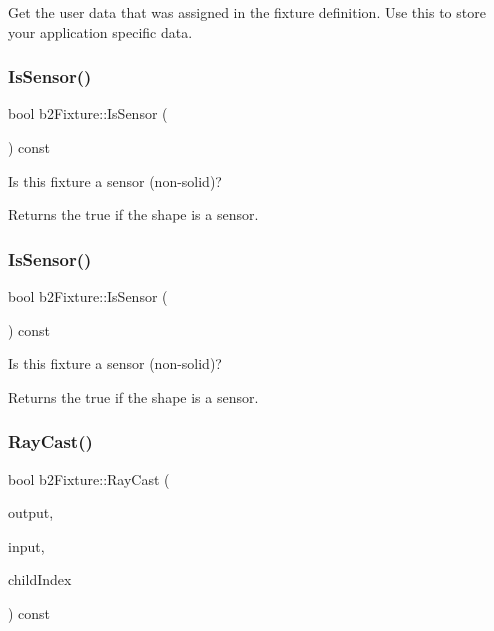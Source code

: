 Get the user data that was assigned in the fixture definition. Use this to store your application specific data. \mbox{\label{classb2Fixture_aedd23d27ff7ce2d53b6c5b7a878a35d3}} 
\subsubsection{\texorpdfstring{Is\+Sensor()}{IsSensor()}\hspace{0.1cm}{\footnotesize\ttfamily [1/2]}}
{\footnotesize\ttfamily bool b2\+Fixture\+::\+Is\+Sensor (\begin{DoxyParamCaption}{ }\end{DoxyParamCaption}) const}

Is this fixture a sensor (non-\/solid)? \begin{DoxyReturn}{Returns}
the true if the shape is a sensor. 
\end{DoxyReturn}
\mbox{\label{classb2Fixture_aedd23d27ff7ce2d53b6c5b7a878a35d3}} 
\subsubsection{\texorpdfstring{Is\+Sensor()}{IsSensor()}\hspace{0.1cm}{\footnotesize\ttfamily [2/2]}}
{\footnotesize\ttfamily bool b2\+Fixture\+::\+Is\+Sensor (\begin{DoxyParamCaption}{ }\end{DoxyParamCaption}) const\hspace{0.3cm}{\ttfamily [inline]}}

Is this fixture a sensor (non-\/solid)? \begin{DoxyReturn}{Returns}
the true if the shape is a sensor. 
\end{DoxyReturn}
\mbox{\label{classb2Fixture_aaaafd69aa3e1a922acc4b9d7fb49170a}} 
\subsubsection{\texorpdfstring{Ray\+Cast()}{RayCast()}\hspace{0.1cm}{\footnotesize\ttfamily [1/2]}}
{\footnotesize\ttfamily bool b2\+Fixture\+::\+Ray\+Cast (\begin{DoxyParamCaption}\item[{\hyperlink{structb2RayCastOutput}{b2\+Ray\+Cast\+Output} $\ast$}]{output,  }\item[{const \hyperlink{structb2RayCastInput}{b2\+Ray\+Cast\+Input} \&}]{input,  }\item[{int32}]{child\+Index }\end{DoxyParamCaption}) const}

